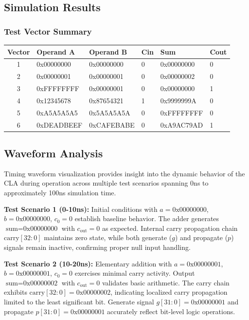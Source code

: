 \documentclass[a4paper, 11pt]{article}
\begin{document}
\subsection{Simulation Results}

\subsubsection{Test Vector Summary}

\begin{table}[H]
\centering
\begin{tabular}{|c|l|l|l|l|l|}
\hline
\textbf{Vector} & \textbf{Operand A} & \textbf{Operand B} & \textbf{Cin} & \textbf{Sum} & \textbf{Cout} \\
\hline
1 & 0x00000000 & 0x00000000 & 0 & 0x00000000 & 0 \\
\hline
2 & 0x00000001 & 0x00000001 & 0 & 0x00000002 & 0 \\
\hline
3 & 0xFFFFFFFF & 0x00000001 & 0 & 0x00000000 & 1 \\
\hline
4 & 0x12345678 & 0x87654321 & 1 & 0x9999999A & 0 \\
\hline
5 & 0xA5A5A5A5 & 0x5A5A5A5A & 0 & 0xFFFFFFFF & 0 \\
\hline
6 & 0xDEADBEEF & 0xCAFEBABE & 0 & 0xA9AC79AD & 1 \\
\hline
\end{tabular}
\end{table}
\subsection{Waveform Analysis}

Timing waveform visualization provides insight into the dynamic behavior of the CLA during operation across multiple test scenarios spanning 0ns to approximately 100ns simulation time.

\textbf{Test Scenario 1 (0-10ns):} Initial conditions with $a = \text{0x00000000}$, $b = \text{0x00000000}$, $c_0 = 0$ establish baseline behavior. The adder generates $\text{sum} = \text{0x00000000}$ with $c_{\text{out}} = 0$ as expected. Internal carry propagation chain $\text{carry}[32:0]$ maintains zero state, while both generate ($g$) and propagate ($p$) signals remain inactive, confirming proper null input handling.

\textbf{Test Scenario 2 (10-20ns):} Elementary addition with $a = \text{0x00000001}$, $b = \text{0x00000001}$, $c_0 = 0$ exercises minimal carry activity. Output $\text{sum} = \text{0x00000002}$ with $c_{\text{out}} = 0$ validates basic arithmetic. The carry chain exhibits $\text{carry}[32:0] = \text{0x00000002}$, indicating localized carry propagation limited to the least significant bit. Generate signal $g[31:0] = \text{0x00000001}$ and propagate $p[31:0] = \text{0x00000001}$ accurately reflect bit-level logic operations.
\end{document}
